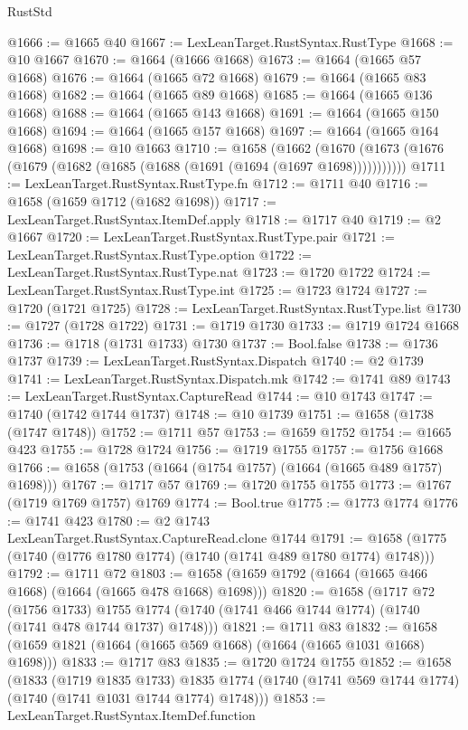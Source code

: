 \begin{lexlean}{RustStd}
\begin{coremodule}
{\begin{coremodule}
{{{{{{{{{{{{{{{{{{{{{{{{{{{{{@1666 := @1665 @40
@1667 := LexLeanTarget.RustSyntax.RustType
@1668 := @10 @1667
@1670 := @1664 (@1666 @1668)
@1673 := @1664 (@1665 @57 @1668)
@1676 := @1664 (@1665 @72 @1668)
@1679 := @1664 (@1665 @83 @1668)
@1682 := @1664 (@1665 @89 @1668)
@1685 := @1664 (@1665 @136 @1668)
@1688 := @1664 (@1665 @143 @1668)
@1691 := @1664 (@1665 @150 @1668)
@1694 := @1664 (@1665 @157 @1668)
@1697 := @1664 (@1665 @164 @1668)
@1698 := @10 @1663
@1710 := @1658
    (@1662 (@1670 (@1673 (@1676 (@1679 (@1682 (@1685 (@1688 (@1691 (@1694 (@1697 @1698)))))))))))
@1711 := LexLeanTarget.RustSyntax.RustType.fn
@1712 := @1711 @40
@1716 := @1658 (@1659 @1712 (@1682 @1698))
@1717 := LexLeanTarget.RustSyntax.ItemDef.apply
@1718 := @1717 @40
@1719 := @2 @1667
@1720 := LexLeanTarget.RustSyntax.RustType.pair
@1721 := LexLeanTarget.RustSyntax.RustType.option
@1722 := LexLeanTarget.RustSyntax.RustType.nat
@1723 := @1720 @1722
@1724 := LexLeanTarget.RustSyntax.RustType.int
@1725 := @1723 @1724
@1727 := @1720 (@1721 @1725)
@1728 := LexLeanTarget.RustSyntax.RustType.list
@1730 := @1727 (@1728 @1722)
@1731 := @1719 @1730
@1733 := @1719 @1724 @1668
@1736 := @1718 (@1731 @1733) @1730
@1737 := Bool.false
@1738 := @1736 @1737
@1739 := LexLeanTarget.RustSyntax.Dispatch
@1740 := @2 @1739
@1741 := LexLeanTarget.RustSyntax.Dispatch.mk
@1742 := @1741 @89
@1743 := LexLeanTarget.RustSyntax.CaptureRead
@1744 := @10 @1743
@1747 := @1740 (@1742 @1744 @1737)
@1748 := @10 @1739
@1751 := @1658 (@1738 (@1747 @1748))
@1752 := @1711 @57
@1753 := @1659 @1752
@1754 := @1665 @423
@1755 := @1728 @1724
@1756 := @1719 @1755
@1757 := @1756 @1668
@1766 := @1658 (@1753 (@1664 (@1754 @1757) (@1664 (@1665 @489 @1757) @1698)))
@1767 := @1717 @57
@1769 := @1720 @1755 @1755
@1773 := @1767 (@1719 @1769 @1757) @1769
@1774 := Bool.true
@1775 := @1773 @1774
@1776 := @1741 @423
@1780 := @2 @1743 LexLeanTarget.RustSyntax.CaptureRead.clone @1744
@1791 := @1658 (@1775 (@1740 (@1776 @1780 @1774) (@1740 (@1741 @489 @1780 @1774) @1748)))
@1792 := @1711 @72
@1803 := @1658 (@1659 @1792 (@1664 (@1665 @466 @1668) (@1664 (@1665 @478 @1668) @1698)))
@1820 := @1658
    (@1717
      @72
      (@1756 @1733)
      @1755
      @1774
      (@1740 (@1741 @466 @1744 @1774) (@1740 (@1741 @478 @1744 @1737) @1748)))
@1821 := @1711 @83
@1832 := @1658 (@1659 @1821 (@1664 (@1665 @569 @1668) (@1664 (@1665 @1031 @1668) @1698)))
@1833 := @1717 @83
@1835 := @1720 @1724 @1755
@1852 := @1658
    (@1833
      (@1719 @1835 @1733)
      @1835
      @1774
      (@1740 (@1741 @569 @1744 @1774) (@1740 (@1741 @1031 @1744 @1774) @1748)))
@1853 := LexLeanTarget.RustSyntax.ItemDef.function
}}}}}}}}}}}}}}}}}}}}}}}}}}}}}
\end{coremodule}}
\end{coremodule}
\end{lexlean}
